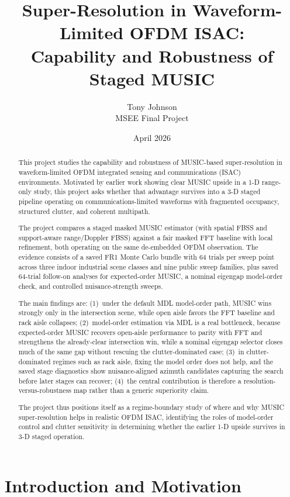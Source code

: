 \documentclass[11pt]{article}
\title{Super-Resolution in Waveform-Limited OFDM ISAC:\\Capability and Robustness of Staged MUSIC}
\author{Tony Johnson\\MSEE Final Project}
\date{April 2026}
\begin{document}
\maketitle

\begin{abstract}
This project studies the capability and robustness of MUSIC-based super-resolution in waveform-limited OFDM integrated sensing and communications (ISAC) environments. Motivated by earlier work showing clear MUSIC upside in a 1-D range-only study, this project asks whether that advantage survives into a 3-D staged pipeline operating on communications-limited waveforms with fragmented occupancy, structured clutter, and coherent multipath.

The project compares a staged masked MUSIC estimator (with spatial FBSS and support-aware range/Doppler FBSS) against a fair masked FFT baseline with local refinement, both operating on the same de-embedded OFDM observation. The evidence consists of a saved FR1 Monte Carlo bundle with 64 trials per sweep point across three indoor industrial scene classes and nine public sweep families, plus saved 64-trial follow-on analyses for expected-order MUSIC, a nominal eigengap model-order check, and controlled nuisance-strength sweeps.

The main findings are: (1)~under the default MDL model-order path, MUSIC wins strongly only in the intersection scene, while open aisle favors the FFT baseline and rack aisle collapses; (2)~model-order estimation via MDL is a real bottleneck, because expected-order MUSIC recovers open-aisle performance to parity with FFT and strengthens the already-clear intersection win, while a nominal eigengap selector closes much of the same gap without rescuing the clutter-dominated case; (3)~in clutter-dominated regimes such as rack aisle, fixing the model order does not help, and the saved stage diagnostics show nuisance-aligned azimuth candidates capturing the search before later stages can recover; (4)~the central contribution is therefore a resolution-versus-robustness map rather than a generic superiority claim.

The project thus positions itself as a regime-boundary study of where and why MUSIC super-resolution helps in realistic OFDM ISAC, identifying the roles of model-order control and clutter sensitivity in determining whether the earlier 1-D upside survives in 3-D staged operation.
\end{abstract}

\section{Introduction and Motivation}
\end{document}
